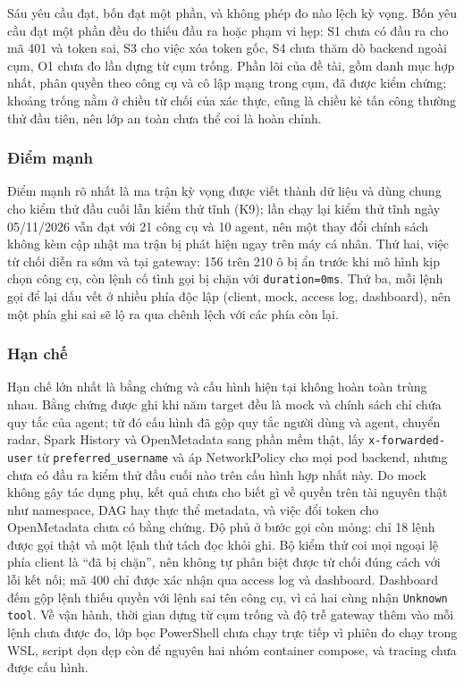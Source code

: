 Sáu yêu cầu đạt, bốn đạt một phần, và không phép đo nào lệch kỳ vọng. Bốn yêu cầu đạt một phần đều do thiếu đầu ra hoặc phạm vi hẹp: S1 chưa có đầu ra cho mã 401 và token sai, S3 cho việc xóa token gốc, S4 chưa thăm dò backend ngoài cụm, O1 chưa đo lần dựng từ cụm trống. Phần lõi của đề tài, gồm danh mục hợp nhất, phân quyền theo công cụ và cô lập mạng trong cụm, đã được kiểm chứng; khoảng trống nằm ở chiều từ chối của xác thực, cũng là chiều kẻ tấn công thường thử đầu tiên, nên lớp an toàn chưa thể coi là hoàn chỉnh.

\subsubsection{Điểm mạnh}

Điểm mạnh rõ nhất là ma trận kỳ vọng được viết thành dữ liệu và dùng chung cho kiểm thử đầu cuối lẫn kiểm thử tĩnh (K9); lần chạy lại kiểm thử tĩnh ngày 05/11/2026 vẫn đạt với 21 công cụ và 10 agent, nên một thay đổi chính sách không kèm cập nhật ma trận bị phát hiện ngay trên máy cá nhân. Thứ hai, việc từ chối diễn ra sớm và tại gateway: 156 trên 210 ô bị ẩn trước khi mô hình kịp chọn công cụ, còn lệnh cố tình gọi bị chặn với \texttt{duration=0ms}. Thứ ba, mỗi lệnh gọi để lại dấu vết ở nhiều phía độc lập (client, mock, access log, dashboard), nên một phía ghi sai sẽ lộ ra qua chênh lệch với các phía còn lại.

\subsubsection{Hạn chế}

Hạn chế lớn nhất là bằng chứng và cấu hình hiện tại không hoàn toàn trùng nhau. Bằng chứng được ghi khi năm target đều là mock và chính sách chỉ chứa quy tắc của agent; từ đó cấu hình đã gộp quy tắc người dùng và agent, chuyển radar, Spark History và OpenMetadata sang phần mềm thật, lấy \texttt{x-forwarded-user} từ \texttt{preferred\_username} và áp NetworkPolicy cho mọi pod backend, nhưng chưa có đầu ra kiểm thử đầu cuối nào trên cấu hình hợp nhất này. Do mock không gây tác dụng phụ, kết quả chưa cho biết gì về quyền trên tài nguyên thật như namespace, DAG hay thực thể metadata, và việc đổi token cho OpenMetadata chưa có bằng chứng.
Độ phủ ở bước gọi còn mỏng: chỉ 18 lệnh được gọi thật và một lệnh thử tách đọc khỏi ghi. Bộ kiểm thử coi mọi ngoại lệ phía client là ``đã bị chặn'', nên không tự phân biệt được từ chối đúng cách với lỗi kết nối; mã 400 chỉ được xác nhận qua access log và dashboard. Dashboard đếm gộp lệnh thiếu quyền với lệnh sai tên công cụ, vì cả hai cùng nhận \texttt{Unknown tool}. Về vận hành, thời gian dựng từ cụm trống và độ trễ gateway thêm vào mỗi lệnh chưa được đo, lớp bọc PowerShell chưa chạy trực tiếp vì phiên đo chạy trong WSL, script dọn dẹp còn để nguyên hai nhóm container compose, và tracing chưa được cấu hình.

\endgroup
